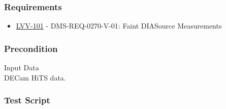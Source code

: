 \hypertarget{requirements-39}{%
\subsubsection{Requirements}\label{requirements-39}}

\begin{itemize}
\tightlist
\item
  \href{https://jira.lsstcorp.org/browse/LVV-101}{LVV-101} -
  DMS-REQ-0270-V-01: Faint DIASource Measurements
\end{itemize}

\hypertarget{precondition-2}{%
\subsubsection{Precondition}\label{precondition-2}}

Input Data\\
\hspace*{0.333em}DECam HiTS data.

\hypertarget{test-script-19}{%
\subsubsection{Test Script}\label{test-script-19}}

